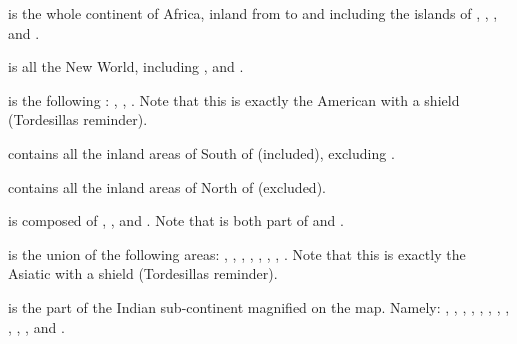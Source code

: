 \begin{deflist}
\item[\anchorcontinent{Africa}] is the whole continent of Africa, inland from
  \granderegionMauritanie to \granderegionSoudan and including the islands of
  , ,
  ,  and
  .
\item[\anchorcontinent{America}] is all the New World, including
  ,  and .
\item[\anchorcontinent{Brazil}] is the following \Areas: ,
  , . Note that this is exactly the
  American \Areas with a  shield (Tordesillas reminder).
\item[\anchorcontinent{South America}] contains all the inland areas of
   South of  (included), excluding
  .
\item[\anchorcontinent{North America}] contains all the inland areas of
   North of  (excluded).
\item[\anchorcontinent{Caraibes}] is composed of ,
  ,  and
  . Note that \granderegionFlorida is both part of
   and \continentCaraibes.
\item[\anchorcontinent{Extreme Orient}] is the union of the following areas:
  , , \granderegionCoree,
  , , ,
  , \granderegionPhilippines. Note that this is exactly
  the Asiatic \Areas with a  shield (Tordesillas
  reminder).
\item[\anchorcontinent{India}] is the part of the Indian sub-continent
  magnified on the map. Namely: \granderegionDelhi, \granderegionAoudh,
  \granderegionBengale, \granderegionGujarat, \granderegionPendjab,
  \granderegionIndus, \granderegionOrissa, \granderegionGondwana,
  \granderegionMumbai, \granderegionHyderabad, \granderegionMalabar,
  \granderegionKarnatika and .

\end{deflist}

